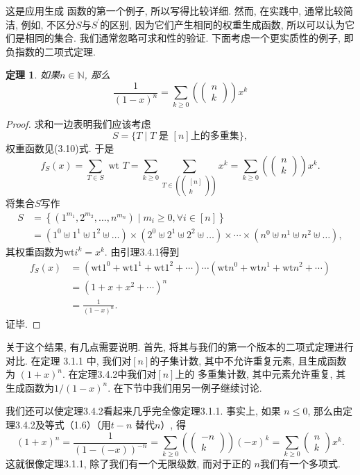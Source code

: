 \documentclass[a4paper,12pt]{ctexbook}
\newtheorem{theorem}[lemma]{\hspace{2em}定理}%
\begin{document}
这是应用生成 函数的第一个例子, 所以写得比较详细. 然而, 在实践中, 通常比较简洁, 例如, 不区分$S$与$S^{\prime}$的区别, 因为它们产生相同的权重生成函数, 所以可以认为它们是相同的集合. 我们通常忽略可求和性的验证. 下面考虑一个更实质性的例子, 即负指数的二项式定理.
\begin{theorem}
	如果$n \in \mathbb{N}$, 那么$$
	\frac{1}{(1-x)^{n}}=\sum_{k \geq 0}\left(\left(\begin{array}{l}
	n \\
	k
	\end{array}\right)\right) x^{k}
	$$
\end{theorem}
\begin{proof}
	求和一边表明我们应该考虑$$
	S=\{T \mid T \text { 是 }[n]\text{上的多重集}\},
	$$权重函数见(3.10)式. 于是$$ f_{S}(x)=\sum_{T \in S} \text { wt } T=\sum_{k \geq 0} \sum_{T \in\left(\left(\begin{array}{c}[n] \\ k\end{array}\right)\right)} x^{k}=\sum_{k \geq 0}\left(\left(\begin{array}{l}n \\ k\end{array}\right)\right) x^{k}. $$
	将集合$S$写作 $$ \begin{aligned} S &=\left\{\left(1^{m_{1}}, 2^{m_{2}}, \ldots, n^{m_{n}}\right) \mid m_{i} \geq 0 , \forall  i\in [n]\right\} \\ &=\left(1^{0} \uplus 1^{1} \uplus 1^{2} \uplus \ldots\right) \times\left(2^{0} \uplus 2^{1} \uplus 2^{2} \uplus \ldots\right) \times \cdots \times\left(n^{0} \uplus n^{1} \uplus n^{2} \uplus \ldots\right) ,\end{aligned} $$其权重函数为wt$i^{k}=x^{k}$. 由引理3.4.1得到$$
	\begin{aligned}
	f_{S}(x) &=\left(\mathrm{wt} 1^{0}+\mathrm{wt} 1^{1}+\mathrm{wt} 1^{2}+\cdots\right) \cdots\left(\mathrm{wt} n^{0}+\mathrm{wt} n^{1}+\mathrm{wt} n^{2}+\cdots\right) \\
	&=\left(1+x+x^{2}+\cdots\right)^{n}\\
	&=\frac{1}{(1-x)^{n}}.
	\end{aligned}
	$$证毕.
\end{proof}
 关于这个结果, 有几点需要说明. 首先, 将其与我们的第一个版本的二项式定理进行对比. 在定理 3.1.1 中, 我们对$[n]$的子集计数, 其中不允许重复元素, 且生成函数为 $(1+x)^{n}$. 在定理3.4.2中我们对$[n]$上的 多重集计数, 其中元素允许重复, 其生成函数为$1 /(1-x)^{n}$. 在下节中我们用另一例子继续讨论.

我们还可以使定理3.4.2看起来几乎完全像定理3.1.1. 事实上, 如果 $n \leq 0$, 那么由定理3.4.2及等式（1.6）（用$t-n$ 替代$n$）, 得
$$
(1+x)^{n}=\frac{1}{(1-(-x))^{-n}}=\sum_{k \geq 0}\left(\left(\begin{array}{c}
-n \\
k
\end{array}\right)\right)(-x)^{k}=\sum_{k \geq 0}\left(\begin{array}{l}
n \\
k
\end{array}\right) x^{k}.
$$这就很像定理3.1.1, 除了我们有一个无限级数, 而对于正的 $n$我们有一个多项式.
\end{document}
